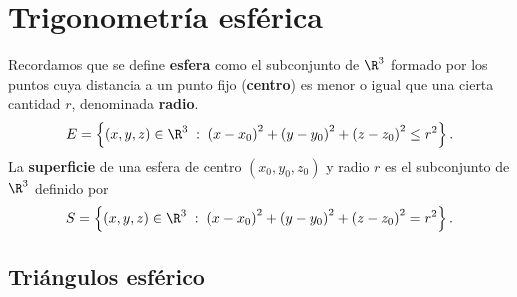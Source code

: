 \section{Trigonometría esférica}
Recordamos que se define \textbf{esfera} como el subconjunto de $\displaystyle \R^{3} $ formado por los puntos cuya distancia a un punto fijo (\textbf{centro}) es menor o igual que una cierta cantidad $\displaystyle r $, denominada \textbf{radio}.
\[ E = \left\{ \left(x,y,z\right) \in \R^{3} \; : \; \left(x - x_{0}\right)^{2} + \left(y-y_{0}\right)^{2} + \left(z - z_{0}\right)^{2} \leq r^{2}\right\}  .\]
La \textbf{superficie} de una esfera de centro $\displaystyle \left(x_{0}, y_{0}, z_{0}\right) $ y radio $\displaystyle r $ es el subconjunto de $\displaystyle \R^{3} $ definido por 
\[S = \left\{ \left(x,y,z\right) \in \R^{3} \; : \; \left(x-x_{0}\right)^{2} + \left(y-y_{0}\right)^{2} + \left(z - z_{0}\right)^{2} = r^{2}\right\}  .\]
\subsection{Triángulos esférico}

